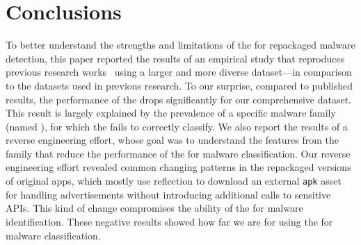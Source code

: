 \section{Conclusions}\label{sec:conclusions}


To better understand the strengths and limitations of the \mas for repackaged malware detection,
this paper reported the results of an empirical study that reproduces previous research works~\cite{DBLP:conf/wcre/BaoLL18,DBLP:journals/jss/CostaMMSSBNR22}
using a larger and more diverse dataset---in comparison to the datasets used in previous research. To our surprise, compared to published results,
the performance of the \mas drops significantly for our comprehensive dataset. This result is largely
explained by the prevalence of a specific malware family (named \gps), for which the \mas fails to correctly classify.
We also report the results of a reverse engineering effort, whose goal was to understand the features from the \gps family that
reduce the performance of the \mas for malware classification. Our reverse engineering effort revealed common changing patterns in the \gps repackaged versions of original apps, which mostly use reflection to download an external
\texttt{apk} asset for handling advertisements without introducing additional calls to sensitive APIs. This kind of change
compromises the ability of the \mas for malware identification. 
These negative results showed how far we are for using the \mas for malware classification.



